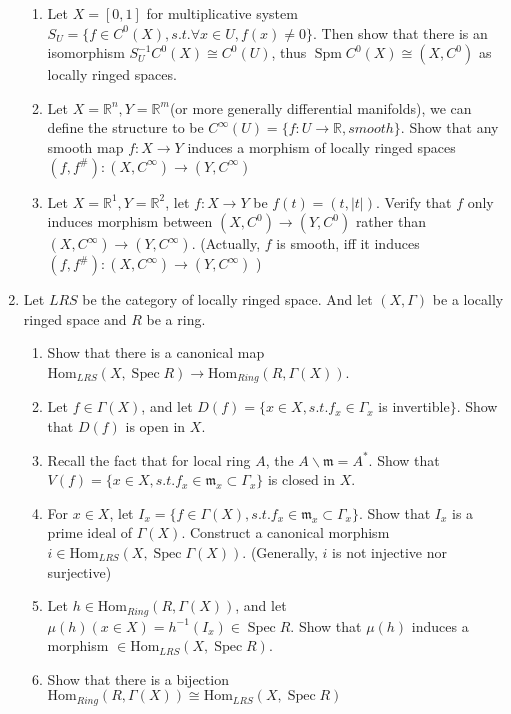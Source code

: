 \documentclass[a4paper,11pt]{article}
\def\bb#1{\mathbb{#1}}
\def\Hom{\mathrm{Hom}}
\DeclareMathOperator{\Spm}{Spm}
\DeclareMathOperator{\Spec}{Spec}
\begin{document}
\begin{enumerate}[1.]
\begin{enumerate}
    \item Let $X=[0,1]$ for multiplicative system $S_U=\{f\in C^0(X), s.t. \forall x\in U, f(x)\neq 0 \}$. Then show that there is an isomorphism $S_U^{-1}C^0(X)\cong C^0(U)$, thus $\Spm C^0(X)\cong (X, C^0)$ as locally ringed spaces.
    \item Let $X=\bb{R}^n, Y=\bb{R}^m$(or more generally differential manifolds), we can define the structure to be  $C^{\infty}(U)=\{f: U\to \bb{R}, smooth\}$. Show that any smooth map $f: X\to Y$ induces a morphism of locally ringed spaces $ (f,f^\#) : (X,C^{\infty})\to (Y,C^{\infty}) $
    \item Let $X=\bb{R}^1, Y=\bb{R}^2$, let $f: X\to Y $ be $f(t)=(t,|t|)$. Verify that $f$ only induces morphism between $ (X,C^0)\to (Y,C^0)$ rather than $ (X,C^{\infty})\to (Y,C^{\infty})$. (Actually, $f$ is smooth, iff it induces $ (f,f^\#) : (X,C^{\infty})\to (Y,C^{\infty}) $ )
\end{enumerate}
\item Let $LRS$ be the category of locally ringed space. And let $(X,\Gamma)$ be a locally ringed space and $R$ be a ring.
\begin{enumerate}
    \item Show that there is a canonical map \\ $\Hom_{LRS}(X,\Spec R) \to \Hom_{Ring}(R,\Gamma(X)) $.
    \item Let $f\in \Gamma(X)$, and let $D(f)=\{x\in X, s.t. f_x \in \Gamma_x$ is invertible$\}$. Show that $D(f)$ is open in $X$.
    \item Recall the fact that for local ring $A$, the $A\backslash \mathfrak{m}= A^*$. Show that $V(f)=\{x\in X, s.t. f_x \in \mathfrak{m}_x\subset \Gamma_x\}$ is closed in $X$.
    \item For $x\in X$, let $I_x =\{f\in \Gamma(X), s.t. f_x \in \mathfrak{m}_x\subset \Gamma_x \}$. Show that $I_x$ is a prime ideal of $ \Gamma(X)$. Construct a canonical morphism $i\in \Hom_{LRS}(X,\Spec \Gamma(X))$. (Generally, $i$ is not injective nor surjective)
    \item Let $h\in \Hom_{Ring}(R,\Gamma(X))$, and let $\mu(h)(x\in X)=h^{-1}(I_x)\in \Spec R$. Show that $\mu(h)$ induces a morphism $\in \Hom_{LRS}(X,\Spec R)$.
    \item Show that there is a bijection $\Hom_{Ring}(R,\Gamma(X))\cong \Hom_{LRS}(X,\Spec R)$
\end{enumerate}


\end{enumerate}
\end{document}
